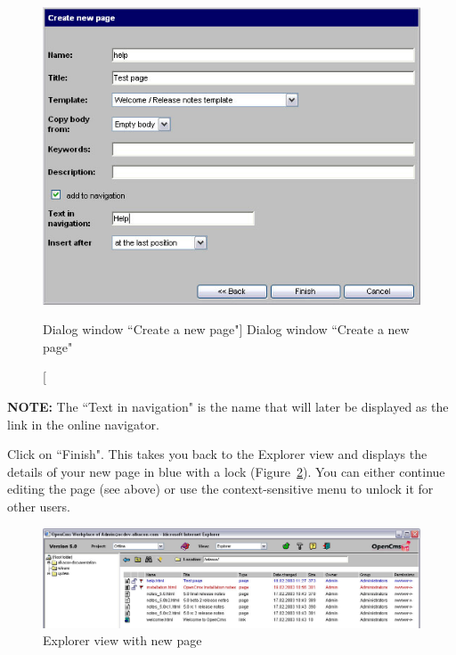 \begin{figure}[!hbt]
\begin{center}
\includegraphics[width=\sgw]
                   {pics/usermanual/newPage02}
\caption[Dialog window ``Create a new page"]
           {Dialog window ``Create a new page"}
\label{newpage02}
\end{center}
\end{figure}

\textbf{NOTE:} The ``Text in navigation" is the name that will
later be displayed as the link in the online navigator.

Click on ``Finish". This takes you back to the Explorer view and
displays the details of your new page in blue with a lock
(Figure~\ref{explnewpage}). You can either continue editing the
page (see above) or use the context-sensitive menu to unlock it
for other users.

\begin{figure}[!hbt]
\begin{center}
\includegraphics[width=\sgw]
                   {pics/usermanual/explNewPage}
\caption[Explorer view with new page]
           {Explorer view with new page}
\label{explnewpage}
\end{center}
\end{figure}

